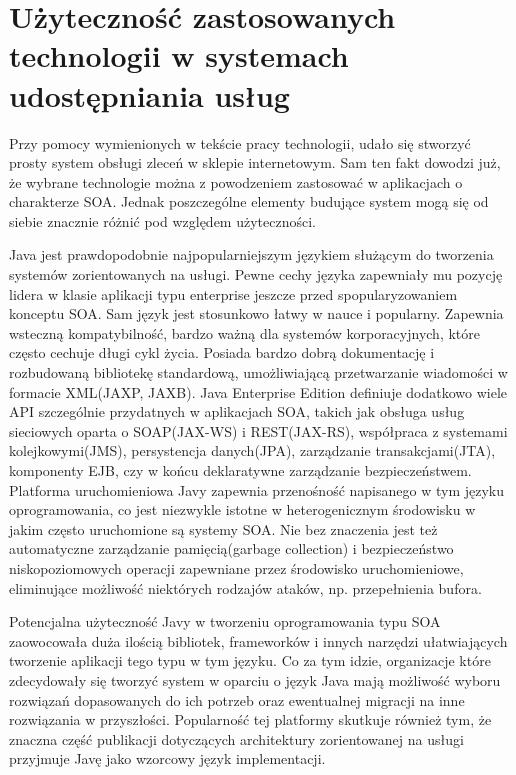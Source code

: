 
\section{Użyteczność zastosowanych technologii w systemach udostępniania usług}
\label{sec:uzytecznosc}

Przy pomocy wymienionych w tekście pracy technologii, udało się stworzyć prosty system obsługi zleceń w sklepie internetowym. Sam ten fakt dowodzi już, że wybrane technologie można z powodzeniem zastosować w aplikacjach o charakterze SOA. Jednak poszczególne elementy budujące system mogą się od siebie znacznie różnić pod względem użyteczności.

Java jest prawdopodobnie najpopularniejszym językiem służącym do tworzenia systemów zorientowanych na usługi. Pewne cechy języka zapewniały mu pozycję lidera w klasie aplikacji typu enterprise jeszcze przed spopularyzowaniem konceptu SOA. Sam język jest stosunkowo łatwy w nauce i popularny. Zapewnia wsteczną kompatybilność, bardzo ważną dla systemów korporacyjnych, które często cechuje długi cykl życia. Posiada bardzo dobrą dokumentację i rozbudowaną bibliotekę standardową, umożliwiającą przetwarzanie wiadomości w formacie XML(JAXP, JAXB). Java Enterprise Edition definiuje dodatkowo wiele API szczególnie przydatnych w aplikacjach SOA, takich jak obsługa usług sieciowych oparta o SOAP(JAX-WS) i REST(JAX-RS), współpraca z systemami kolejkowymi(JMS), persystencja danych(JPA), zarządzanie transakcjami(JTA), komponenty EJB, czy w końcu deklaratywne zarządzanie bezpieczeństwem. Platforma uruchomieniowa Javy zapewnia przenośność napisanego w tym języku oprogramowania, co jest niezwykle istotne w heterogenicznym środowisku w jakim często uruchomione są systemy SOA. Nie bez znaczenia jest też automatyczne zarządzanie pamięcią(garbage collection) i bezpieczeństwo niskopoziomowych operacji zapewniane przez środowisko uruchomieniowe, eliminujące możliwość niektórych rodzajów ataków, np. przepełnienia bufora. 

Potencjalna użyteczność Javy w tworzeniu oprogramowania typu SOA zaowocowała duża ilością bibliotek, frameworków i innych narzędzi ułatwiających tworzenie aplikacji tego typu w tym języku. Co za tym idzie, organizacje które zdecydowały się tworzyć system w oparciu o język Java mają możliwość wyboru rozwiązań dopasowanych do ich potrzeb oraz ewentualnej migracji na inne rozwiązania w przyszłości. Popularność tej platformy skutkuje również tym, że znaczna część publikacji dotyczących architektury zorientowanej na usługi przyjmuje Javę jako wzorcowy język implementacji.

